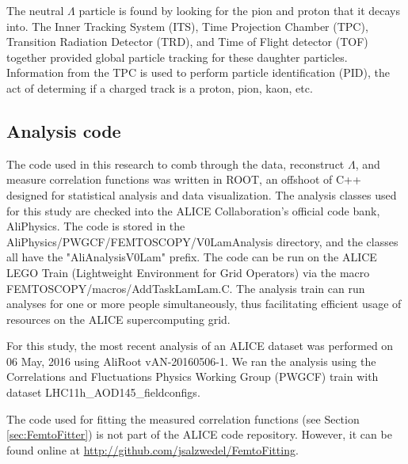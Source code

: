 The neutral $\Lambda$ particle is found by looking for the pion and proton that it decays into.
The Inner Tracking System (ITS), Time Projection Chamber (TPC), Transition Radiation Detector (TRD), and Time of Flight detector (TOF) together provided global particle tracking for these daughter particles.
Information from the TPC is used to perform particle identification (PID), the act of determing if a charged track is a proton, pion, kaon, etc.


\subsection{Analysis code}
The code used in this research to comb through the data, reconstruct $\Lambda$, and measure correlation functions was written in ROOT, an offshoot of C++ designed for statistical analysis and data visualization.
The analysis classes used for this study are checked into the ALICE Collaboration's official code bank, AliPhysics.
The code is stored in the AliPhysics/PWGCF/FEMTOSCOPY/V0LamAnalysis directory, and the classes all have the "AliAnalysisV0Lam" prefix.
The code can be run on the ALICE LEGO Train (Lightweight Environment for Grid Operators) via the macro FEMTOSCOPY/macros/AddTaskLamLam.C.
The analysis train can run analyses for one or more people simultaneously, thus facilitating efficient usage of resources on the ALICE supercomputing grid.

For this study, the most recent analysis of an ALICE dataset was performed on 06 May, 2016 using AliRoot vAN-20160506-1.
We ran the analysis using the Correlations and Fluctuations Physics Working Group (PWGCF) train with dataset LHC11h\_AOD145\_fieldconfigs.

The code used for fitting the measured correlation functions (see Section \ref{sec:FemtoFitter}) is not part of the ALICE code repository.
However, it can be found online at \url{http://github.com/jsalzwedel/FemtoFitting}.
